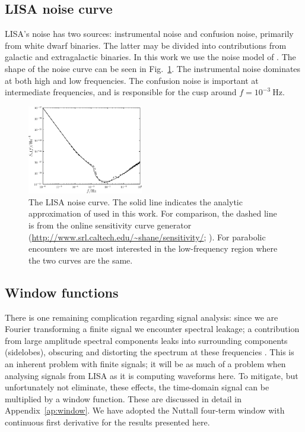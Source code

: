 \documentclass[useAMS,usedcolumn,usegraphicx,usenatbib]{mn2e}
\newcommand{\figref}[1]{Fig.~\ref{fig:#1}}
\newcommand{\apref}[1]{Appendix~\ref{ap:#1}}
\newcommand{\units}[1]{\ensuremath{~\mathrm{#1}}}
\begin{document}
\subsection{LISA noise curve}\label{sec:Noise}

LISA's noise has two sources: instrumental noise and confusion noise, primarily from white dwarf binaries. The latter may be divided into contributions from galactic and extragalactic binaries. In this work we use the noise model of \citet{Barack2004}. The shape of the noise curve can be seen in \figref{Noise}. The instrumental noise dominates at both high and low frequencies. The confusion noise is important at intermediate frequencies, and is responsible for the cusp around $f = 10^{-3}\units{Hz}$.
\begin{figure}
\begin{center}
\includegraphics[width=0.45\textwidth]{Fig_Noise}
\caption{The LISA noise curve. The solid line indicates the analytic approximation of \citet{Barack2004} used in this work. For comparison, the dashed line is from the online sensitivity curve generator (\url{http://www.srl.caltech.edu/~shane/sensitivity/}; \citealt*{Larson2000, Larson2002}). For parabolic encounters we are most interested in the low-frequency region where the two curves are the same.}
\label{fig:Noise}
\end{center}
\end{figure}

\subsection{Window functions}

There is one remaining complication regarding signal analysis: since we are Fourier transforming a finite signal we encounter spectral leakage; a contribution from large amplitude spectral components leaks into surrounding components (sidelobes), obscuring and distorting the spectrum at these frequencies \citep{Harris1978}. This is an inherent problem with finite signals; it will be as much of a problem when analysing signals from LISA as it is computing waveforms here. To mitigate, but unfortunately not eliminate, these effects, the time-domain signal can be multiplied by a window function. These are discussed in detail in \apref{window}. We have adopted the Nuttall four-term window with continuous first derivative \citep{Nuttall1981} for the results presented here.
\end{document}
